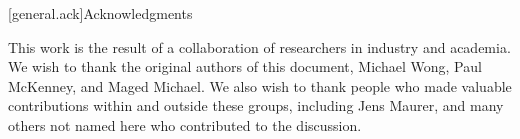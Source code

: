[general.ack]{Acknowledgments}

This work is the result of a collaboration of researchers in industry and academia. We wish to thank the
original authors of this document, Michael Wong, Paul McKenney, and Maged Michael. We also wish to thank people
who made valuable contributions within and outside these groups, including Jens Maurer, and many others not named
here who contributed to the discussion.




